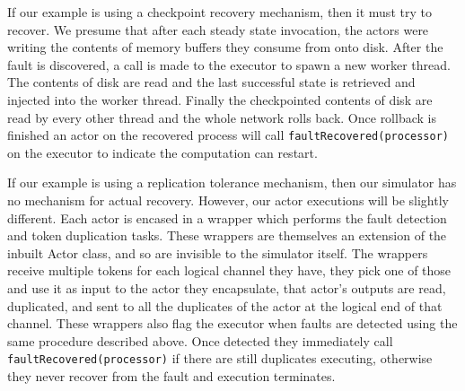 If our example is using a checkpoint recovery mechanism, then it must try to recover.
We presume that after each steady state invocation, the actors were writing the contents of memory buffers they consume from onto disk.
After the fault is discovered, a call is made to the executor to spawn a new worker thread.
The contents of disk are read and the last successful state is retrieved and injected into the worker thread.
Finally the checkpointed contents of disk are read by every other thread and the whole network rolls back.
Once rollback is finished an actor on the recovered process will call \verb=faultRecovered(processor)= on the executor to indicate the computation can restart.

If our example is using a replication tolerance mechanism, then our simulator has no mechanism for actual recovery.
However, our actor executions will be slightly different.
Each actor is encased in a wrapper which performs the fault detection and token duplication tasks.
These wrappers are themselves an extension of the inbuilt Actor class, and so are invisible to the simulator itself.
The wrappers receive multiple tokens for each logical channel they have, they pick one of those and use it as input to the actor they encapsulate, that actor's outputs are read, duplicated, and sent to all the duplicates of the actor at the logical end of that channel.
These wrappers also flag the executor when faults are detected using the same procedure described above.
Once detected they immediately call \verb=faultRecovered(processor)= if there are still duplicates executing, otherwise they never recover from the fault and execution terminates.
